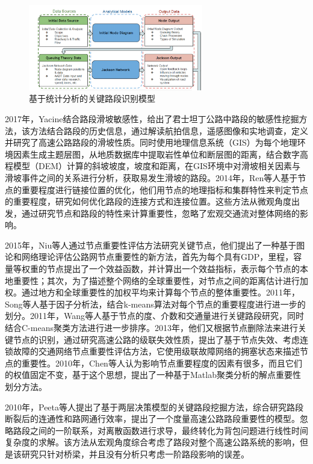 			\begin{figure}[h]
			\centering
					\begin{minipage}{0.8\linewidth}
						\centering
						\includegraphics[width=3in]{picture/jackson_network}
						\caption{基于统计分析的关键路段识别模型}
						\label{jackson}
					\end{minipage}
			\end{figure}


	2017年，Yacine结合路段滑坡敏感性，给出了君士坦丁公路中路段的敏感性挖掘方法\parencite{Yacine2017Landslide}，该方法结合路段的历史信息，通过解读航拍信息，遥感图像和实地调查，定义并研究了高速公路路段的滑坡性质。同时使用地理信息系统（GIS）为每个地理环境因素生成主题层图，从地质数据库中提取岩性单位和断层图的距离，结合数字高程模型（DEM）计算的斜坡坡度，坡度和距离，在GIS环境中对滑坡相关因素与滑坡事件之间的关系进行分析，获取易发生滑坡的路段。2014年，Ren等人基于节点的重要程度进行链接位置的优化，他们用节点的地理指标和集群特性来判定节点的重要程度，研究如何优化路段的连接方式和连接位置。这些方法从微观角度出发，通过研究节点和路段的特性来计算重要性，忽略了宏观交通流对整体网络的影响。

	2015年，Niu等人通过节点重要性评估方法研究关键节点\parencite{Niu2015Evaluation}，他们提出了一种基于图论和网络理论评估公路网节点重要性的新方法，首先为每个具有GDP，里程，容量等权重的节点提出了一个效益函数，并计算出一个效益指标，表示每个节点的本地重要性；其次，为了描述整个网络的全球重要性，对节点之间的距离估计进行加权。通过地方和全球重要性的加权平均来计算每个节点的整体重要性。2011年，Song等人基于因子分析法，结合k-means算法对每个节点的重要程度进行进一步的划分\parencite{Song2011Node}。2011年，Wang等人基于节点的度、介数和交通量进行关键路段研究，同时结合C-means聚类方法进行进一步排序\parencite{Wang2011Signal}。2013年，他们又根据节点删除法来进行关键节点的识别\parencite{Wang2013Calculating}，通过研究高速公路的级联失效性质，提出了基于节点失效、考虑连锁故障的交通网络节点重要性评估方法，它使用级联故障网络的拥塞状态来描述节点的重要性。2010年，Chen等人认为影响节点重要程度的因素有很多，而且它们的权值固定不变，基于这个思想，提出了一种基于Matlab聚类分析的解点重要性划分方法。

	2010年，Peeta等人提出了基于两层决策模型的关键路段挖掘方法\parencite{Peeta2010Pre}，综合研究路段断裂后的连通性和路网通行效率，提出了一个度量高速公路路段重要性的模型。忽略路段之间的一阶联系，对离散函数进行求导，最终转化为背包问题进行线性时间复杂度的求解。该方法从宏观角度综合考虑了路段对整个高速公路系统的影响，但是该研究只针对桥梁，并且没有分析只考虑一阶路段影响的误差。

